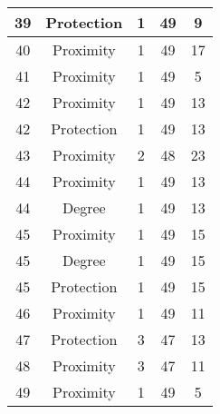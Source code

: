 \documentclass[results.tex]{subfiles}
\begin{document}
\begin{center}
\begin{tabular}{| c || c | c | c | c |}
    \hline
    39 & Protection & 1 & 49 & 9 \\ 
    \hline
    40 & Proximity & 1 & 49 & 17 \\ 
    \hline
    41 & Proximity & 1 & 49 & 5 \\ 
    \hline
    42 & Proximity & 1 & 49 & 13 \\ 
    \hline
    42 & Protection & 1 & 49 & 13 \\ 
    \hline
    43 & Proximity & 2 & 48 & 23 \\ 
    \hline
    44 & Proximity & 1 & 49 & 13 \\ 
    \hline
    44 & Degree & 1 & 49 & 13 \\ 
    \hline
    45 & Proximity & 1 & 49 & 15 \\ 
    \hline
    45 & Degree & 1 & 49 & 15 \\ 
    \hline
    45 & Protection & 1 & 49 & 15 \\ 
    \hline
    46 & Proximity & 1 & 49 & 11 \\ 
    \hline
    47 & Protection & 3 & 47 & 13 \\ 
    \hline
    48 & Proximity & 3 & 47 & 11 \\ 
    \hline
    49 & Proximity & 1 & 49 & 5 \\ 
    \hline   \end{tabular}
\end{center}
\end{document}
